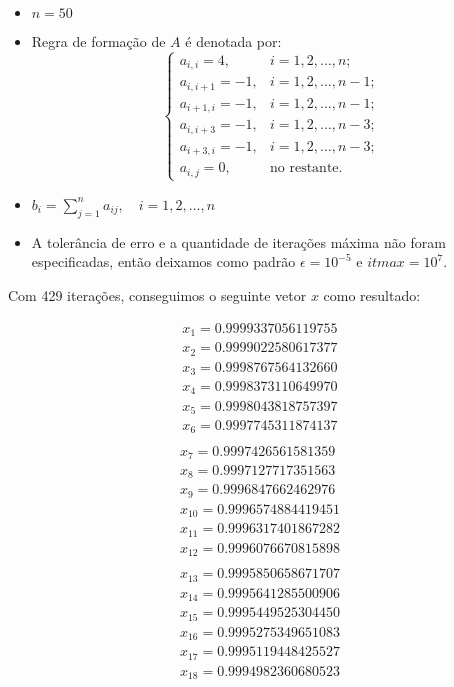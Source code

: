 	\begin{itemize}
		\item \(n = 50\)
		\item Regra de formação de \(A\) é denotada por:
		\[
			\begin{cases}
				a_{i,i} = 4,	& i = 1, 2, \ldots, n;\\
				a_{i,i+1} = -1,	& i = 1, 2, \ldots, n-1;\\
				a_{i+1,i} = -1,	& i = 1, 2, \ldots, n-1;\\
				a_{i,i+3} = -1,	& i = 1, 2, \ldots, n-3;\\
				a_{i+3,i} = -1,	& i = 1, 2, \ldots, n-3;\\
				a_{i,j} = 0,	& \mbox{no restante.}
			\end{cases}
		\]
		\item \(b_{i} = \sum_{j=1}^{n} a_{ij}, \quad i = 1, 2, \ldots, n\)
		\item A tolerância de erro e a quantidade de iterações máxima não foram especificadas,
			então deixamos como padrão \(\epsilon = 10^{-5}\) e \(itmax = 10^{7}\).
	\end{itemize}
Com 429 iterações, conseguimos o seguinte vetor \(x\) como resultado:
\begin{multicols}{3}
	\begin{align*}
		x_{1}  = 0.9999337056119755\\
		x_{2}  = 0.9999022580617377\\
		x_{3}  = 0.9998767564132660\\
		x_{4}  = 0.9998373110649970\\
		x_{5}  = 0.9998043818757397\\
		x_{6}  = 0.9997745311874137\\
	\end{align*}
	\vfill
	\columnbreak
	\begin{align*}
		x_{7}  = 0.9997426561581359\\
		x_{8}  = 0.9997127717351563\\
		x_{9}  = 0.9996847662462976\\
		x_{10} = 0.9996574884419451\\
		x_{11} = 0.9996317401867282\\
		x_{12} = 0.9996076670815898\\
	\end{align*}
	\vfill
	\columnbreak
	\begin{align*}
		x_{13} = 0.9995850658671707\\
		x_{14} = 0.9995641285500906\\
		x_{15} = 0.9995449525304450\\
		x_{16} = 0.9995275349651083\\
		x_{17} = 0.9995119448425527\\
		x_{18} = 0.9994982360680523\\
	\end{align*}
\end{multicols}
